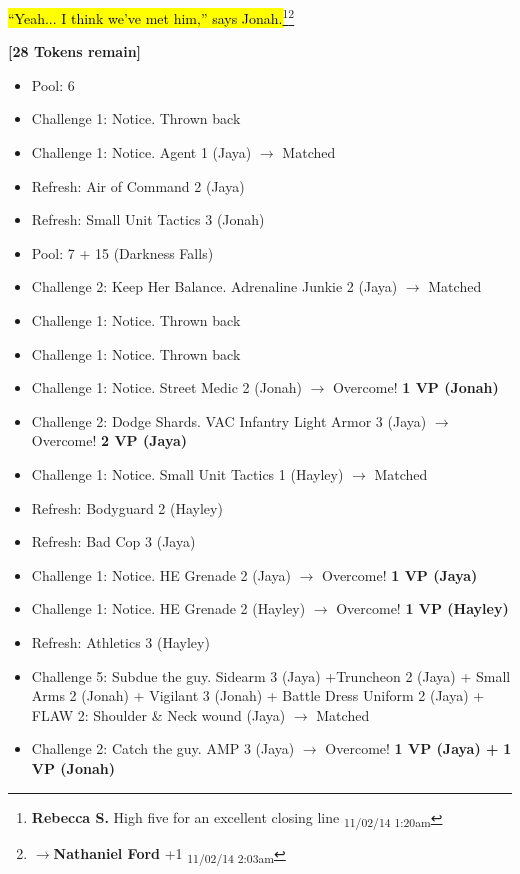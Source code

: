 \hl{``Yeah... I think we've met him,'' says Jonah.}\footnote{\textbf{Rebecca S. }High five for an excellent closing line \textsubscript{11/02/14 1:20am}}\footnote{$\rightarrow$\textbf{Nathaniel Ford }+1 \textsubscript{11/02/14 2:03am}}



\textbf{{[}28 Tokens remain{]}}





\begin{itemize}
\item Pool: 6
\item Challenge 1: Notice.  Thrown back
\item Challenge 1: Notice.  Agent 1 (Jaya) $\rightarrow$ Matched
\item Refresh: Air of Command 2 (Jaya)
\item Refresh: Small Unit Tactics 3 (Jonah)
\item Pool: 7 + 15 (Darkness Falls)
\item Challenge 2: Keep Her Balance.  Adrenaline Junkie 2 (Jaya) $\rightarrow$ Matched
\item Challenge 1: Notice.  Thrown back
\item Challenge 1: Notice.  Thrown back
\item Challenge 1: Notice.  Street Medic 2 (Jonah) $\rightarrow$ Overcome! \textbf{1 VP (Jonah)}
\item Challenge 2: Dodge Shards.  VAC Infantry Light Armor 3 (Jaya) $\rightarrow$ Overcome! \textbf{2 VP (Jaya)}
\item Challenge 1: Notice.  Small Unit Tactics 1 (Hayley) $\rightarrow$ Matched
\item Refresh: Bodyguard 2 (Hayley)
\item Refresh: Bad Cop 3 (Jaya)
\item Challenge 1: Notice.  HE Grenade 2 (Jaya) $\rightarrow$ Overcome! \textbf{1 VP (Jaya)}
\item Challenge 1: Notice.  HE Grenade 2 (Hayley) $\rightarrow$ Overcome! \textbf{1 VP (Hayley)}
\item Refresh: Athletics 3 (Hayley)
\item Challenge 5: Subdue the guy.  Sidearm 3 (Jaya) +Truncheon 2 (Jaya) + Small Arms 2 (Jonah) + Vigilant 3 (Jonah) + Battle Dress Uniform 2 (Jaya) + FLAW 2: Shoulder \& Neck wound (Jaya) $\rightarrow$ Matched
\item Challenge 2: Catch the guy.  AMP 3 (Jaya) $\rightarrow$ Overcome! \textbf{1 VP (Jaya) + } \textbf{1 VP (Jonah)}

\end{itemize}

